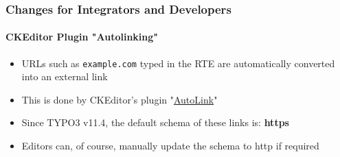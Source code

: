 %

\begin{frame}[fragile]
	\frametitle{Changes for Integrators and Developers}
	\framesubtitle{CKEditor Plugin "Autolinking"}


	\begin{itemize}
		\item URLs such as \texttt{example.com} typed in the RTE are automatically
			converted into an external link
		\item This is done by CKEditor's plugin
			"\href{https://ckeditor.com/docs/ckeditor5/latest/features/link.html#autolink-feature}{AutoLink}"
		\item Since TYPO3 v11.4, the default schema of these links is: \textbf{https}
		\item Editors can, of course, manually update the schema to http if required
	\end{itemize}

\end{frame}

